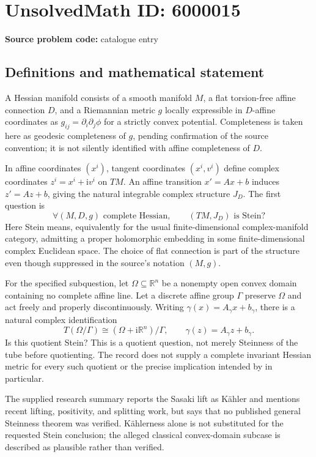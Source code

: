 \documentclass[11pt]{article}
\newcommand{\R}{\mathbb{R}}
\begin{document}
\section*{UnsolvedMath ID: 6000015}
\textbf{Source problem code:} catalogue entry
\subsection{Definitions and mathematical statement}
A Hessian manifold consists of a smooth manifold \(M\), a flat torsion-free affine connection \(D\), and a Riemannian metric \(g\) locally expressible in \(D\)-affine coordinates as \(g_{ij}=\partial_i\partial_j\phi\) for a strictly convex potential. Completeness is taken here as geodesic completeness of \(g\), pending confirmation of the source convention; it is not silently identified with affine completeness of \(D\).

In affine coordinates \((x^i)\), tangent coordinates \((x^i,v^i)\) define complex coordinates \(z^i=x^i+\mathrm i v^i\) on \(TM\). An affine transition \(x'=Ax+b\) induces \(z'=Az+b\), giving the natural integrable complex structure \(J_D\). The first question is
\[
\forall(M,D,g)\text{ complete Hessian},\qquad (TM,J_D)\text{ is Stein}?
\]
Here Stein means, equivalently for the usual finite-dimensional complex-manifold category, admitting a proper holomorphic embedding in some finite-dimensional complex Euclidean space. The choice of flat connection is part of the structure even though suppressed in the source's notation \((M,g)\).

For the specified subquestion, let \(\Omega\subseteq\R^n\) be a nonempty open convex domain containing no complete affine line. Let a discrete affine group \(\Gamma\) preserve \(\Omega\) and act freely and properly discontinuously. Writing \(\gamma(x)=A_\gamma x+b_\gamma\), there is a natural complex identification
\[
T(\Omega/\Gamma)\cong
(\Omega+\mathrm i\R^n)/\Gamma,
\qquad \gamma(z)=A_\gamma z+b_\gamma.
\]
Is this quotient Stein? This is a quotient question, not merely Steinness of the tube before quotienting. The record does not supply a complete invariant Hessian metric for every such quotient or the precise implication intended by in particular.

The supplied research summary reports the Sasaki lift as Kähler and mentions recent lifting, positivity, and splitting work, but says that no published general Steinness theorem was verified. Kählerness alone is not substituted for the requested Stein conclusion; the alleged classical convex-domain subcase is described as plausible rather than verified.
\end{document}
